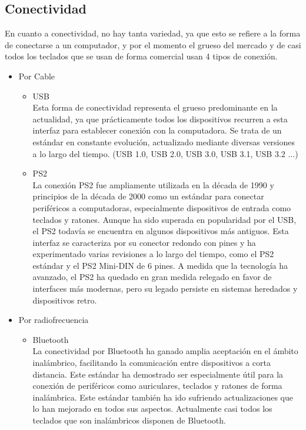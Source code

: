 \subsection{Conectividad}
En cuanto a conectividad, no hay tanta variedad, ya que esto se refiere a la forma de conectarse a un computador, y por el momento el grueso del mercado y de casi todos los teclados que se usan de forma comercial usan 4 tipos de conexión. 
\newpage
\begin{itemize}
    \item Por Cable \cite{Keyboards-connection-types-wired}
    \begin{itemize}
        \item \gls{USB} \\
            Esta forma de conectividad representa el grueso predominante en la actualidad, ya que prácticamente todos los dispositivos recurren a esta interfaz para establecer conexión con la computadora. Se trata de un estándar en constante evolución, actualizado mediante diversas versiones a lo largo del tiempo.  (\gls{USB} 1.0, \gls{USB} 2.0, \gls{USB} 3.0, \gls{USB} 3.1, \gls{USB} 3.2 ...)
        \item \gls{PS2} \\
            La conexión \gls{PS2} fue ampliamente utilizada en la década de 1990 y principios de la década de 2000 como un estándar para conectar periféricos a computadoras, especialmente dispositivos de entrada como teclados y ratones. Aunque ha sido superada en popularidad por el \gls{USB}, el \gls{PS2} todavía se encuentra en algunos dispositivos más antiguos. Esta interfaz se caracteriza por su conector redondo con pines y ha experimentado varias revisiones a lo largo del tiempo, como el \gls{PS2} estándar y el \gls{PS2} Mini-DIN de 6 pines. A medida que la tecnología ha avanzado, el \gls{PS2} ha quedado en gran medida relegado en favor de interfaces más modernas, pero su legado persiste en sistemas heredados y dispositivos retro. 
    \end{itemize}
    \item Por radiofrecuencia \cite{Keyboards-connection-types-wireless}
    \begin{itemize}
        \item \gls{Bluetooth} \\
            La conectividad por \gls{Bluetooth} ha ganado amplia aceptación en el ámbito inalámbrico, facilitando la comunicación entre dispositivos a corta distancia. Este estándar ha demostrado ser especialmente útil para la conexión de periféricos como auriculares, teclados y ratones de forma inalámbrica. Este estándar también ha ido sufriendo actualizaciones que lo han mejorado en todos sus aspectos. Actualmente casi todos los teclados que son inalámbricos disponen de Bluetooth.
    

\end{itemize}
\end{itemize}
